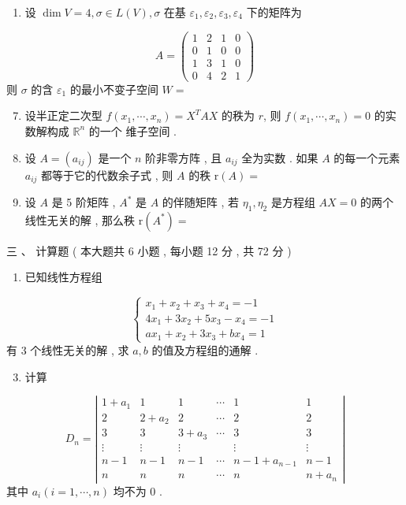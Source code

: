 \documentclass[10pt]{article}
\begin{document}
{\begin{enumerate}
  \item  设  $\operatorname{dim} V=4, \sigma \in L(V), \sigma$  在基  $\varepsilon_{1}, \varepsilon_{2}, \varepsilon_{3}, \varepsilon_{4}$  下的矩阵为 

\end{enumerate}
$$
A=\left(\begin{array}{llll}
1 & 2 & 1 & 0 \\
0 & 1 & 0 & 0 \\
1 & 3 & 1 & 0 \\
0 & 4 & 2 & 1
\end{array}\right)
$$
 则  $\sigma$  的含  $\varepsilon_{1}$  的最小不变子空间  $W=$

\begin{enumerate}
  \setcounter{enumi}{6}
  \item  设半正定二次型  $f\left(x_{1}, \cdots, x_{n}\right)=X^{T} A X$  的秩为  $r$,  则  $f\left(x_{1}, \cdots, x_{n}\right)=0$  的实数解构成  $\mathbb{R}^{n}$  的一个   维子空间 .

  \item  设  $A=\left(a_{i j}\right)$  是一个  $n$  阶非零方阵 ,  且  $a_{i j}$  全为实数 .  如果  $A$  的每一个元素  $a_{i j}$  都等于它的代数余子式 ,  则  $A$  的秩  $\mathrm{r}(A)=$

  \item  设  $A$  是  5  阶矩阵 , $A^{*}$  是  $A$  的伴随矩阵 ,  若  $\eta_{1}, \eta_{2}$  是方程组  $A X=0$  的两个线性无关的解 ,  那么秩  $\mathrm{r}\left(A^{*}\right)=$

\end{enumerate}
 三 、 计算题 ( 本大题共  6  小题 ,  每小题  12  分 ,  共  72  分 )

\begin{enumerate}
  \item  已知线性方程组 
\end{enumerate}
$$
\left\{\begin{array}{l}
x_{1}+x_{2}+x_{3}+x_{4}=-1 \\
4 x_{1}+3 x_{2}+5 x_{3}-x_{4}=-1 \\
a x_{1}+x_{2}+3 x_{3}+b x_{4}=1
\end{array}\right.
$$
 有  3  个线性无关的解 ,  求  $a, b$  的值及方程组的通解 .

\begin{enumerate}
  \setcounter{enumi}{2}
  \item  计算 
\end{enumerate}
$$
D_{n}=\left|\begin{array}{cccccc}
1+a_{1} & 1 & 1 & \cdots & 1 & 1 \\
2 & 2+a_{2} & 2 & \cdots & 2 & 2 \\
3 & 3 & 3+a_{3} & \cdots & 3 & 3 \\
\vdots & \vdots & \vdots & & \vdots & \vdots \\
n-1 & n-1 & n-1 & \cdots & n-1+a_{n-1} & n-1 \\
n & n & n & \cdots & n & n+a_{n}
\end{array}\right|
$$
 其中  $a_{i}(i=1, \cdots, n)$  均不为  0 .

}
\end{document}
